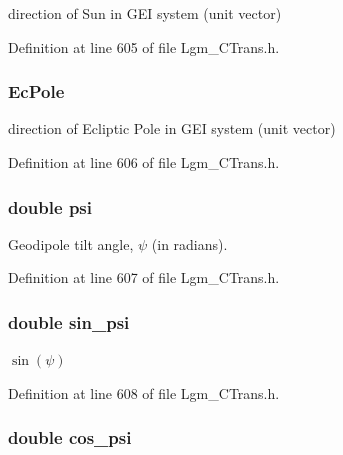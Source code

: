 direction of Sun in GEI system (unit vector) 



Definition at line 605 of file Lgm\_\-CTrans.h.\hypertarget{struct_lgm___c_trans_f0671f5d9fb2088ea9c46adfe6e1b7e5}{
\subsubsection[{EcPole}]{ {\bf EcPole}}}
\label{struct_lgm___c_trans_f0671f5d9fb2088ea9c46adfe6e1b7e5}


direction of Ecliptic Pole in GEI system (unit vector) 



Definition at line 606 of file Lgm\_\-CTrans.h.\hypertarget{struct_lgm___c_trans_8614e82343ef042e83a6021f3a2ccd16}{
\subsubsection[{psi}]{\setlength{\rightskip}{0pt plus 5cm}double {\bf psi}}}
\label{struct_lgm___c_trans_8614e82343ef042e83a6021f3a2ccd16}


Geodipole tilt angle, $\psi$ (in radians). 



Definition at line 607 of file Lgm\_\-CTrans.h.\hypertarget{struct_lgm___c_trans_5b35fcda1a15310fa7b7e3e242431de3}{
\subsubsection[{sin\_\-psi}]{\setlength{\rightskip}{0pt plus 5cm}double {\bf sin\_\-psi}}}
\label{struct_lgm___c_trans_5b35fcda1a15310fa7b7e3e242431de3}


$\sin(\psi)$ 



Definition at line 608 of file Lgm\_\-CTrans.h.\hypertarget{struct_lgm___c_trans_98e0e08bb8a65f90813e5adb482aeb2c}{
\subsubsection[{cos\_\-psi}]{\setlength{\rightskip}{0pt plus 5cm}double {\bf cos\_\-psi}}}
\label{struct_lgm___c_trans_98e0e08bb8a65f90813e5adb482aeb2c}


